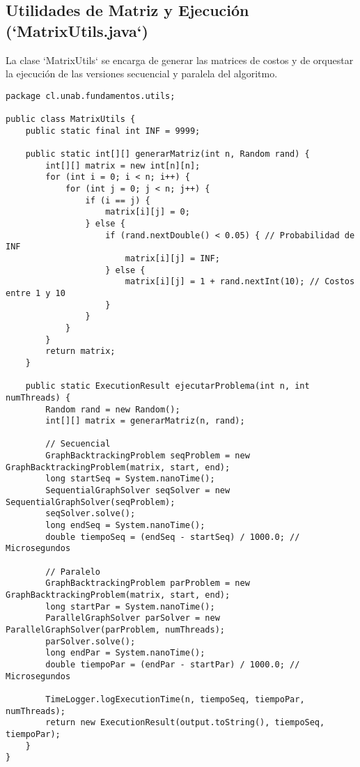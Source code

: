 \documentclass[12pt]{article}
\begin{document}
\subsection*{Utilidades de Matriz y Ejecución (`MatrixUtils.java`)}
La clase `MatrixUtils` se encarga de generar las matrices de costos y de orquestar la ejecución de las versiones secuencial y paralela del algoritmo.

\begin{lstlisting}[caption={Fragmento de `MatrixUtils.java`}, morekeywords={Random}]
package cl.unab.fundamentos.utils;

public class MatrixUtils {
    public static final int INF = 9999;

    public static int[][] generarMatriz(int n, Random rand) {
        int[][] matrix = new int[n][n];
        for (int i = 0; i < n; i++) {
            for (int j = 0; j < n; j++) {
                if (i == j) {
                    matrix[i][j] = 0;
                } else {
                    if (rand.nextDouble() < 0.05) { // Probabilidad de INF
                        matrix[i][j] = INF;
                    } else {
                        matrix[i][j] = 1 + rand.nextInt(10); // Costos entre 1 y 10
                    }
                }
            }
        }
        return matrix;
    }

    public static ExecutionResult ejecutarProblema(int n, int numThreads) {
        Random rand = new Random();
        int[][] matrix = generarMatriz(n, rand);

        // Secuencial
        GraphBacktrackingProblem seqProblem = new GraphBacktrackingProblem(matrix, start, end);
        long startSeq = System.nanoTime();
        SequentialGraphSolver seqSolver = new SequentialGraphSolver(seqProblem);
        seqSolver.solve();
        long endSeq = System.nanoTime();
        double tiempoSeq = (endSeq - startSeq) / 1000.0; // Microsegundos

        // Paralelo
        GraphBacktrackingProblem parProblem = new GraphBacktrackingProblem(matrix, start, end);
        long startPar = System.nanoTime();
        ParallelGraphSolver parSolver = new ParallelGraphSolver(parProblem, numThreads);
        parSolver.solve();
        long endPar = System.nanoTime();
        double tiempoPar = (endPar - startPar) / 1000.0; // Microsegundos
        
        TimeLogger.logExecutionTime(n, tiempoSeq, tiempoPar, numThreads);
        return new ExecutionResult(output.toString(), tiempoSeq, tiempoPar);
    }
}
\end{lstlisting}
\end{document}

